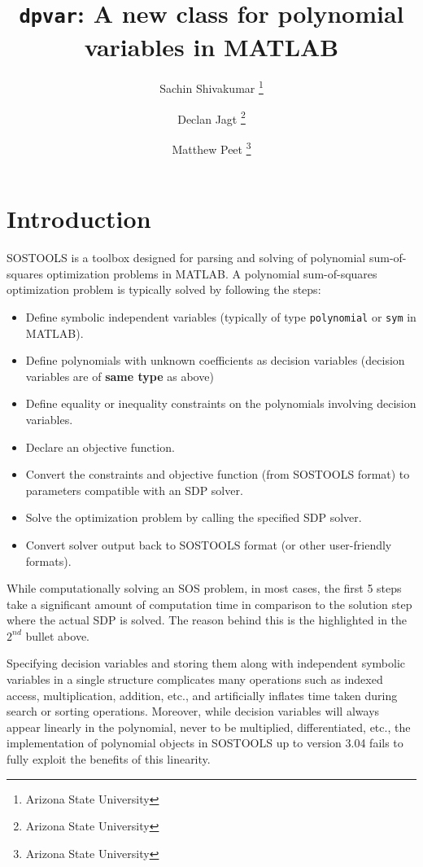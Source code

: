 \documentclass{article}
\begin{document}
	\title{\texttt{dpvar}: A new class for polynomial variables in MATLAB}
	\author{Sachin Shivakumar \thanks{Arizona State University} \and Declan Jagt \thanks{Arizona State University} \and Matthew Peet \thanks{Arizona State University}}
	\maketitle
	\tableofcontents
	\newpage


	\section{Introduction}\label{sec:introduction}
	SOSTOOLS is a toolbox designed for parsing and solving of polynomial sum-of-squares optimization problems in MATLAB. A polynomial sum-of-squares optimization problem is typically solved by following the steps:
	\begin{itemize}
		\item Define symbolic independent variables (typically of type \texttt{polynomial} or \texttt{sym} in MATLAB).
		\item Define polynomials with unknown coefficients as decision variables (decision variables are of \textbf{same type} as above)
		\item Define equality or inequality constraints on the polynomials involving decision variables.
		\item Declare an objective function.
		\item Convert the constraints and objective function (from SOSTOOLS format) to parameters compatible with an SDP solver.
		\item Solve the optimization problem by calling the specified SDP solver.
		\item Convert solver output back to SOSTOOLS format (or other user-friendly formats).
	\end{itemize}
	
	While computationally solving an SOS problem, in most cases, the first 5 steps take a significant amount of computation time in comparison to the solution step where the actual SDP is solved. The reason behind this is the highlighted in the $2^{nd}$ bullet above.
	
	Specifying decision variables and storing them along with independent symbolic variables in a single structure complicates many operations such as indexed access, multiplication, addition, etc., and artificially inflates time taken during search or sorting operations. Moreover, while decision variables will always appear linearly in the polynomial, never to be multiplied, differentiated, etc., the implementation of polynomial objects in SOSTOOLS up to version 3.04 fails to fully exploit the benefits of this linearity.
\end{document}
